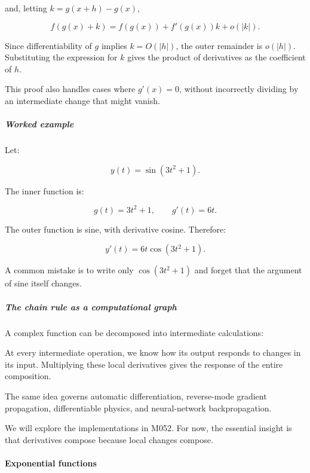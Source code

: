 and, letting \(k=g(x+h)-g(x)\),

\[
f(g(x)+k)=f(g(x))+f'(g(x))k+o(|k|).
\]

Since differentiability of \(g\) implies \(k=O(|h|)\), the outer remainder is \(o(|h|)\). Substituting the expression for \(k\) gives the product of derivatives as the coefficient of \(h\).

This proof also handles cases where \(g'(x)=0\), without incorrectly dividing by an intermediate change that might vanish.

\begin{allmightroleexample}

\subparagraph{Worked example}\label{01-foundations-i-ch020-worked-example}

\hypertarget{01-foundations-i-ch020-worked-example}{}

Let:

\end{allmightroleexample}

\[
y(t)=\sin(3t^2+1).
\]

The inner function is:

\[
g(t)=3t^2+1,\qquad g'(t)=6t.
\]

The outer function is sine, with derivative cosine. Therefore:

\[
\boxed{y'(t)=6t\cos(3t^2+1)}.
\]

A common mistake is to write only \(\cos(3t^2+1)\) and forget that the argument of sine itself changes.

\subparagraph{The chain rule as a computational graph}\label{01-foundations-i-ch020-the-chain-rule-as-a-computational-graph}

\hypertarget{01-foundations-i-ch020-the-chain-rule-as-a-computational-graph}{}

A complex function can be decomposed into intermediate calculations:

At every intermediate operation, we know how its output responds to changes in its input. Multiplying these local derivatives gives the response of the entire composition.

The same idea governs automatic differentiation, reverse-mode gradient propagation, differentiable physics, and neural-network backpropagation.

We will explore the implementations in M052. For now, the essential insight is that derivatives compose because local changes compose.

\paragraph{Exponential functions}\label{01-foundations-i-ch020-exponential-functions}

